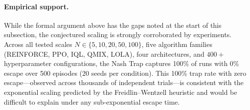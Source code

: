\paragraph{Empirical support.}
While the formal argument above has the gaps noted at the start of this subsection, the conjectured scaling is strongly corroborated by experiments. Across all tested scales $N \in \{5, 10, 20, 50, 100\}$, five algorithm families (REINFORCE, PPO, IQL, QMIX, LOLA), four architectures, and $400{+}$ hyperparameter configurations, the Nash Trap captures 100\% of runs with 0\% escape over 500 episodes (20 seeds per condition). This 100\% trap rate with zero escape---observed across thousands of independent trials---is consistent with the exponential scaling predicted by the Freidlin--Wentzell heuristic and would be difficult to explain under any sub-exponential escape time.
\qedhere
